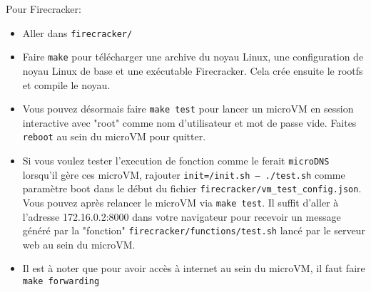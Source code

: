 \documentclass[12pt]{article}
\begin{document}
Pour Firecracker:
\begin{itemize}
	\item Aller dans \texttt{firecracker/}
	\item Faire \lstinline|make| pour télécharger une archive du noyau Linux, une configuration de noyau Linux de base et une exécutable Firecracker. Cela crée ensuite le rootfs et compile le noyau. 
	\item Vous pouvez désormais faire  \lstinline|make test| pour lancer un microVM en session interactive avec "root" comme nom d'utilisateur et mot de passe vide. Faites \lstinline|reboot| au sein du microVM pour quitter.
	\item Si vous voulez tester l'execution de fonction comme le ferait \texttt{microDNS} lorsqu'il gère ces microVM, rajouter \texttt{init=/init.sh -- ./test.sh} comme paramètre boot dans le début du fichier \texttt{firecracker/vm\_test\_config.json}. Vous pouvez après relancer le microVM via \lstinline|make test|. Il suffit d'aller à l'adresse 172.16.0.2:8000 dans votre navigateur pour recevoir un message généré par la "fonction" \texttt{firecracker/functions/test.sh} lancé par le serveur web au sein du microVM.
	\item Il est à noter que pour avoir accès à internet au sein du microVM, il faut faire \lstinline|make forwarding|
\end{itemize}

\pagebreak
\nocite{*}


\end{document}
